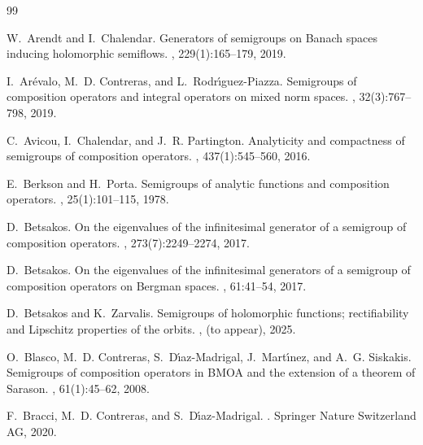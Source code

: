 \documentclass[11pt]{amsart}
\numberwithin{equation}{section}
\theoremstyle{definition}
\begin{document}
	
	
	
	
	
	
	\medskip
	\begin{thebibliography}{99}
		
		W.~Arendt and I.~Chalendar.
		\newblock Generators of semigroups on {B}anach spaces inducing holomorphic semiflows.
		, 229(1):165--179, 2019.
		
		I.~Ar\'{e}valo, M.~D. Contreras, and L.~Rodr\'{\i}guez-Piazza.
		\newblock Semigroups of composition operators and integral operators on mixed norm spaces.
		, 32(3):767--798, 2019.
		
		C.~Avicou, I.~Chalendar, and J.~R. Partington.
		\newblock Analyticity and compactness of semigroups of composition operators.
		, 437(1):545--560, 2016.
		
		E.~Berkson and H.~Porta.
		\newblock Semigroups of analytic functions and composition operators.
		, 25(1):101--115, 1978.
		
		D.~Betsakos.
		\newblock On the eigenvalues of the infinitesimal generator of a semigroup of composition operators.
		, 273(7):2249--2274, 2017.
		
		D.~Betsakos.
		\newblock On the eigenvalues of the infinitesimal generators of a semigroup of composition operators on {B}ergman spaces.
		, 61:41--54, 2017.
		
		D.~Betsakos and K.~Zarvalis.
		\newblock Semigroups of holomorphic functions; rectifiability and {L}ipschitz properties of the orbits.
		, (to appear), 2025.
		
		O.~Blasco, M.~D. Contreras, S.~D\'{\i}az-Madrigal, J.~Mart\'{\i}nez, and A.~G. Siskakis.
		\newblock Semigroups of composition operators in {BMOA} and the extension of a theorem of {S}arason.
		, 61(1):45--62, 2008.
		
		F.~Bracci, M.~D. Contreras, and S.~D{\'\i}az-Madrigal.
		.
		\newblock Springer Nature Switzerland AG, 2020.
		

\end{thebibliography}
\end{document}
